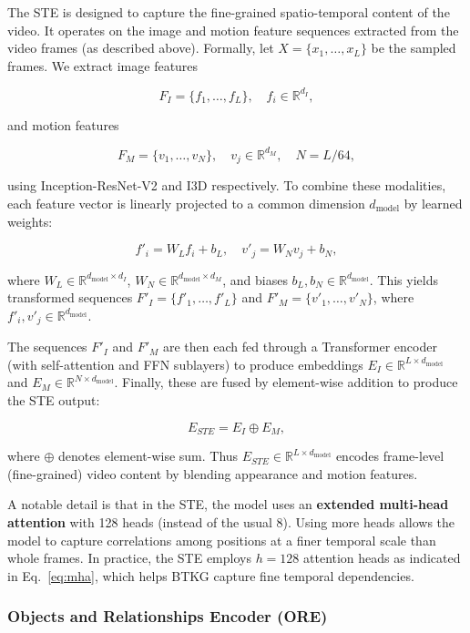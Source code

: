The STE is designed to capture the fine-grained spatio-temporal content of the video. It operates on the image and motion feature sequences extracted from the video frames (as described above). Formally, let $X=\{x_1,\dots,x_L\}$ be the sampled frames. We extract image features

$$
F_I = \{f_1,\dots,f_L\}, \quad f_i\in\mathbb{R}^{d_I},
$$

and motion features

$$
F_M = \{v_1,\dots,v_N\}, \quad v_j\in\mathbb{R}^{d_M}, \quad N = L/64,
$$

using Inception-ResNet-V2 and I3D respectively. To combine these modalities, each feature vector is linearly projected to a common dimension $d_{\text{model}}$ by learned weights:

$$
f'_i = W_L f_i + b_L,\quad v'_j = W_N v_j + b_N,
$$

where $W_L\in\mathbb{R}^{d_{\text{model}}\times d_I}$, $W_N\in\mathbb{R}^{d_{\text{model}}\times d_M}$, and biases $b_L,b_N\in\mathbb{R}^{d_{\text{model}}}$. This yields transformed sequences $F'_I = \{f'_1,\dots,f'_L\}$ and $F'_M = \{v'_1,\dots,v'_N\}$, where $f'_i, v'_j \in \mathbb{R}^{d_{\text{model}}}$.

The sequences $F'_I$ and $F'_M$ are then each fed through a Transformer encoder (with self-attention and FFN sublayers) to produce embeddings $E_I \in\mathbb{R}^{L\times d_{\text{model}}}$ and $E_M \in\mathbb{R}^{N\times d_{\text{model}}}$. Finally, these are fused by element-wise addition to produce the STE output:

$$
E_{STE} = E_I \oplus E_M,
$$

where $\oplus$ denotes element-wise sum. Thus $E_{STE}\in\mathbb{R}^{L\times d_{\text{model}}}$ encodes frame-level (fine-grained) video content by blending appearance and motion features.

A notable detail is that in the STE, the model uses an \textbf{extended multi-head attention} with 128 heads (instead of the usual 8). Using more heads allows the model to capture correlations among positions at a finer temporal scale than whole frames. In practice, the STE employs $h=128$ attention heads as indicated in Eq.~\ref{eq:mha}, which helps BTKG capture fine temporal dependencies.

\subsubsection{Objects and Relationships Encoder (ORE)}

